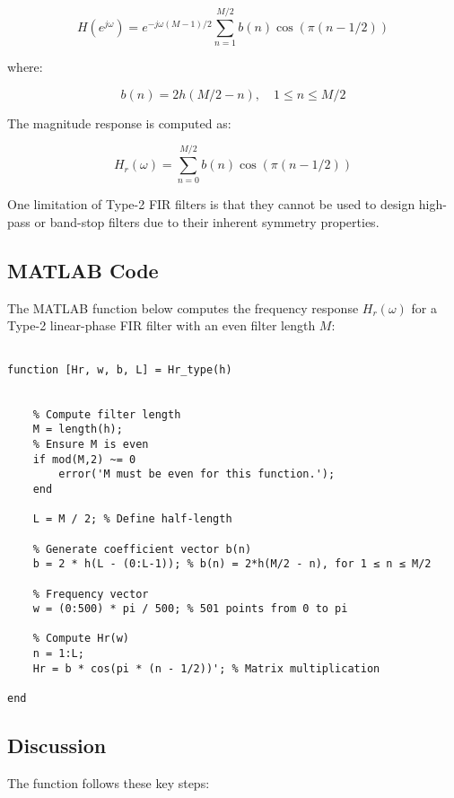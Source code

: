 \documentclass[a4paper,12pt]{article}
\begin{document}
\[
H(e^{j\omega}) = e^{-j\omega (M-1)/2} \sum_{n=1}^{M/2} b(n) \cos(\pi (n - 1/2))
\]

where:

\[
b(n) = 2h(M/2 - n), \quad 1 \leq n \leq M/2
\]

The magnitude response is computed as:

\[
H_r(\omega) = \sum_{n=0}^{M/2} b(n) \cos(\pi (n - 1/2))
\]

One limitation of Type-2 FIR filters is that they cannot be used to design high-pass or band-stop filters due to their inherent symmetry properties.

\subsection{MATLAB Code}

The MATLAB function below computes the frequency response \( H_r(\omega) \) for a Type-2 linear-phase FIR filter with an even filter length \( M \):

\begin{verbatim}
    
function [Hr, w, b, L] = Hr_type(h)


    % Compute filter length
    M = length(h); 
    % Ensure M is even
    if mod(M,2) ~= 0
        error('M must be even for this function.');
    end
 
    L = M / 2; % Define half-length

    % Generate coefficient vector b(n)
    b = 2 * h(L - (0:L-1)); % b(n) = 2*h(M/2 - n), for 1 ≤ n ≤ M/2
    
    % Frequency vector
    w = (0:500) * pi / 500; % 501 points from 0 to pi

    % Compute Hr(w)
    n = 1:L;
    Hr = b * cos(pi * (n - 1/2))'; % Matrix multiplication

end
\end{verbatim}

\subsection{Discussion}

The function follows these key steps:
\end{document}
